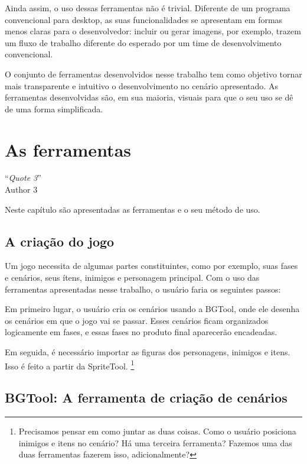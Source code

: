 \documentclass[brazil]{abnt}
\begin{document}
Ainda assim, o uso dessas ferramentas não é trivial. Diferente de um programa convencional para desktop, as suas funcionalidades se apresentam em formas menos claras para o desenvolvedor: incluir ou gerar imagens, por exemplo, trazem um fluxo de trabalho diferente do esperado por um time de desenvolvimento convencional. 

O conjunto de ferramentas desenvolvidos nesse trabalho tem como objetivo tornar mais transparente e intuitivo o desenvolvimento no cenário apresentado. As ferramentas desenvolvidas são, em sua maioria, visuais para que o seu uso se dê de uma forma simplificada.

\chapter{As ferramentas\label{cap:ferramentas}}

\vfill{}
\begin{flushright}{}``\emph{Quote 3}''\\
{\small Author 3}\end{flushright}{\small \par}
\vfill{}

Neste capítulo são apresentadas as ferramentas e o seu método de uso.
\newpage

\section{A criação do jogo\label{sec:workflow}}

Um jogo necessita de algumas partes constituintes, como por exemplo, suas fases e cenários, seus ítens, inimigos e personagem principal. Com o uso das ferramentas apresentadas nesse trabalho, o usuário faria os seguintes passos:

Em primeiro lugar, o usuário cria os cenários usando a BGTool, onde ele desenha os cenários em que o jogo vai se passar. Esses cenários ficam organizados logicamente em fases, e essas fases no produto final aparecerão encadeadas.

Em seguida, é necessário importar as figuras dos personagens, inimigos e itens. Isso é feito a partir da SpriteTool. 
\footnote{Precisamos pensar em como juntar as duas coisas. Como o usuário posiciona inimigos e itens no cenário? Há uma terceira ferramenta? Fazemos uma das duas ferramentas fazerem isso, adicionalmente?}

\section{BGTool: A ferramenta de criação de cenários}
\end{document}
